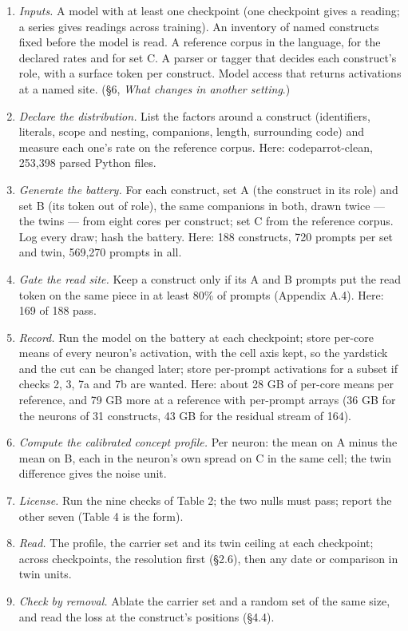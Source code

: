 \documentclass{article}
\begin{document}
\begin{enumerate}[topsep=2pt,itemsep=1pt,parsep=0pt,partopsep=0pt,leftmargin=*]
\item \emph{Inputs.} A model with at least one checkpoint (one checkpoint gives a reading; a series gives readings across training). An inventory of named constructs fixed before the model is read. A reference corpus in the language, for the declared rates and for set C. A parser or tagger that decides each construct's role, with a surface token per construct. Model access that returns activations at a named site. (\S6, \emph{What changes in another setting}.)
\item \emph{Declare the distribution.} List the factors around a construct (identifiers, literals, scope and nesting, companions, length, surrounding code) and measure each one's rate on the reference corpus. Here: codeparrot-clean, 253,398 parsed Python files.
\item \emph{Generate the battery.} For each construct, set A (the construct in its role) and set B (its token out of role), the same companions in both, drawn twice --- the twins --- from eight cores per construct; set C from the reference corpus. Log every draw; hash the battery. Here: 188 constructs, 720 prompts per set and twin, 569,270 prompts in all.
\item \emph{Gate the read site.} Keep a construct only if its A and B prompts put the read token on the same piece in at least 80\% of prompts (Appendix A.4). Here: 169 of 188 pass.
\item \emph{Record.} Run the model on the battery at each checkpoint; store per-core means of every neuron's activation, with the cell axis kept, so the yardstick and the cut can be changed later; store per-prompt activations for a subset if checks 2, 3, 7a and 7b are wanted. Here: about 28 GB of per-core means per reference, and 79 GB more at a reference with per-prompt arrays (36 GB for the neurons of 31 constructs, 43 GB for the residual stream of 164).
\item \emph{Compute the calibrated concept profile.} Per neuron: the mean on A minus the mean on B, each in the neuron's own spread on C in the same cell; the twin difference gives the noise unit.
\item \emph{License.} Run the nine checks of Table 2; the two nulls must pass; report the other seven (Table 4 is the form).
\item \emph{Read.} The profile, the carrier set and its twin ceiling at each checkpoint; across checkpoints, the resolution first (\S2.6), then any date or comparison in twin units.
\item \emph{Check by removal.} Ablate the carrier set and a random set of the same size, and read the loss at the construct's positions (\S4.4).
\end{enumerate}
\end{document}
